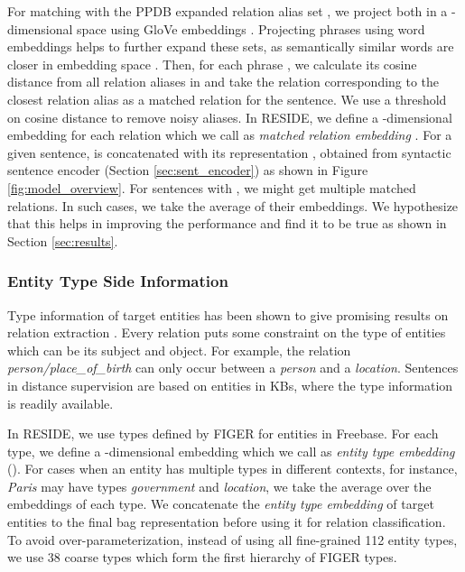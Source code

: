 \documentclass[11pt,a4paper]{article}
\newcommand{\reffig}[1]{Figure \ref{#1}}
\newcommand{\refsec}[1]{Section \ref{#1}}
\newcommand{\method}{RESIDE}
\begin{document}
For matching  with the PPDB expanded relation alias set , we project both in a -dimensional space using GloVe embeddings \cite{pennington2014glove}. Projecting phrases using word embeddings helps to further expand these sets, as semantically similar words are closer in embedding space \cite{word2vec_paper,pennington2014glove}. Then, for each phrase , we calculate its cosine distance from all relation aliases in  and take the relation corresponding to the closest relation alias as a matched relation for the sentence. We use a threshold on cosine distance to remove noisy aliases. In \method{}, we define a -dimensional embedding for each relation which we call as \textit{matched relation embedding} . For a given sentence,  is concatenated with its representation , obtained from syntactic sentence encoder (\refsec{sec:sent_encoder}) as shown in \reffig{fig:model_overview}. For sentences with , we might get multiple matched relations. In such cases, we take the average of their embeddings. We hypothesize that this helps in improving the performance and find it to be true as shown in \refsec{sec:results}. 

\subsubsection*{Entity Type Side Information}
\label{sec:type_sideinfo}
Type information of target entities has been shown to give promising results on relation extraction \cite{figer_paper,typeinfo2017}. Every relation puts some constraint on the type of entities which can be its subject and object. For example, the relation \textit{person/place\_of\_birth} can only occur between a \textit{person} and a \textit{location}. Sentences in distance supervision are based on entities in KBs, where the type information is readily available.

In \method{}, we use types defined by FIGER \cite{figer_paper} for entities in Freebase. For each type, we define a -dimensional embedding which we call as \textit{entity type embedding} (). For cases when an entity has multiple types in different contexts, for instance, \textit{Paris} may have types \textit{government} and \textit{location}, we take the average over the embeddings of each type. We concatenate the \textit{entity type embedding} of target entities to the final bag representation before using it for relation classification. To avoid over-parameterization, instead of using all fine-grained 112 entity types, we use 38 coarse types which form the first hierarchy of FIGER types.
\end{document}
